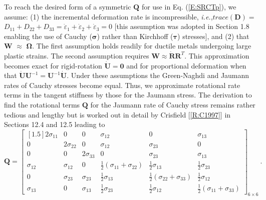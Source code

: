 \documentclass[11pt]{report}
\numberwithin{equation}{section}
\newcommand{\bmf } {\boldsymbol }  %
\newcommand{\ie}{\emph{i.e.},\xspace}
\newcommand{\vareps}{\varepsilon}
\newcommand{\dotR} {\dot{\mathbf{R}}}
\begin{document}
To reach the desired form of a symmetric $\mathbf{Q}$ for use in Eq. (\ref{E:SRCTp}),
we assume: (1) the incremental deformation rate is incompressible, \ie $trace(\mathbf{D})=$$D_{11} + D_{22} +
D_{33}$$=\dot{\vareps}_{1}+\dot{\vareps}_{2}+\dot{\vareps}_{3}=0$ [this assumption
was adopted in Section 1.8 enabling the use of Cauchy ($\bmf{\sigma}$) rather than Kirchhoff ($\bmf{\tau}$)
stresses],
and (2) that $\mathbf{W}$ $\approx$ $\mathbf{\Omega}$. The first assumption holds readily for ductile metals
undergoing large plastic strains.  The second assumption requires $\mathbf{W}\approx\dotR \mathbf{R}^T$.
This approximation becomes exact for  rigid-rotation $\dot{\mathbf{U}}=\mathbf{0}$ and for 
proportional deformation when that 
$\dot{\mathbf{U}} \mathbf{U}^{-1} = \mathbf{U}^{-1} \dot{\mathbf{U}}$.
Under these assumptions the Green-Naghdi and Jaumann rates of Cauchy stresses become equal. Thus,
we approximate rotational rate terms   in the tangent stiffness by those for the Jaumann stress.
The derivation to find the rotational terms $\mathbf{Q}$ for the Jaumann rate of Cauchy
stress remains rather tedious and lengthy but is worked out
in detail by Crisfield  [\ref{R:C1997}] in Sections 12.4 and 12.5 leading to 
\begin{equation}\label{E:SRCTt}\mathbf{Q} =  \begin{bmatrix} [1.5]
2 \sigma_{11} &0 & 0& \sigma_{12}& 0 & \sigma_{13}  \\
0 & 2\sigma_{22} & 0 & \sigma_{12}& \sigma_{23}& 0 \\
0 &0& 2\sigma_{33} &0&\sigma_{23} & \sigma_{13} \\
\sigma_{12} & \sigma_{12} &0& \frac{1}{2}(\sigma_{11}+\sigma_{22})&  \frac{1}{2}\sigma_{13}&\frac{1}{2}\sigma_{23}\\
0 & \sigma_{23}&\sigma_{23} & \frac{1}{2}\sigma_{13} & \frac{1}{2}(\sigma_{22}+\sigma_{33}) &  \frac{1}{2}\sigma_{12}\\
\sigma_{13} & 0 & \sigma_{13} &  \frac{1}{2}\sigma_{23} & \frac{1}{2}\sigma_{12} & \frac{1}{2}(\sigma_{11}+\sigma_{33})
\end{bmatrix}_{6\times 6} \ .
\end{equation}
\normalsize
\end{document}
